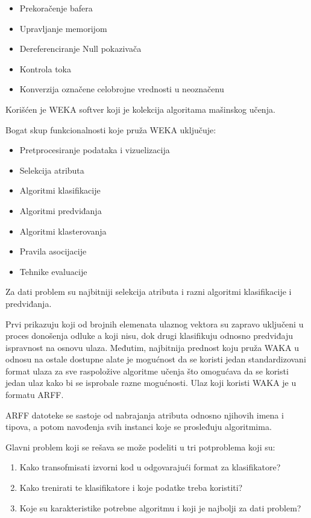 \documentclass[a4paper]{article}
\begin{document}
\begin{itemize}
\item Prekoračenje bafera

\item Upravljanje memorijom

\item Dereferenciranje Null pokazivača

\item Kontrola toka

\item Konverzija označene celobrojne vrednosti u neoznačenu
\end{itemize}


Korišćen je WEKA softver koji je kolekcija algoritama mašinskog učenja.

Bogat skup funkcionalnosti koje pruža WEKA uključuje:
\begin{itemize}
\item Pretprocesiranje podataka i vizuelizacija
\item Selekcija atributa
\item Algoritmi klasifikacije
\item Algoritmi predviđanja
\item Algoritmi klasterovanja
\item Pravila asocijacije
\item Tehnike evaluacije
\end{itemize}


Za dati problem su najbitniji selekcija atributa i razni algoritmi klasifikacije i predviđanja.

Prvi prikazuju koji od brojnih elemenata ulaznog vektora su zapravo uključeni u proces donošenja odluke a koji nisu, dok
drugi klasifikuju odnosno predviđaju ispravnost na osnovu ulaza.
Međutim, najbitnija prednost koju pruža WAKA u odnosu na ostale dostupne alate je mogućnost da se koristi
jedan standardizovani format ulaza za sve raspoložive algoritme učenja što omogućava da se koristi jedan ulaz kako bi se isprobale
razne mogućnosti. Ulaz koji koristi WAKA je u formatu ARFF.

ARFF datoteke se sastoje od nabrajanja atributa odnosno njihovih imena i tipova, a potom navođenja svih instanci koje se prosleđuju algoritmima.

Glavni problem koji se rešava se može podeliti u tri potproblema koji su:
\begin{enumerate}
\item Kako transofmisati izvorni kod u odgovarajući format za klasifikatore?
\item Kako trenirati te klasifikatore i koje podatke treba koristiti?
\item Koje su karakteristike potrebne algoritmu i koji je najbolji za dati problem?
\end{enumerate}
\end{document}
